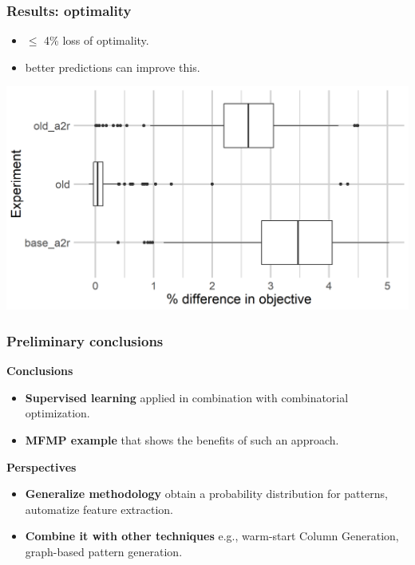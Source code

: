 \begin{frame}
\frametitle{\textbf{Results: optimality}}

  \begin{itemize}[<+->]
    \item $\le$ 4\% loss of optimality.
    \item better predictions can improve this.
  \end{itemize}

  \includegraphics[width=0.8\linewidth]{images/quality_degradation_2tasks}

\end{frame}

\begin{frame}
\frametitle{\textbf{Preliminary conclusions}}
  \pause
  \begin{block}{\textbf{Conclusions}}
    \begin{itemize}[<+->]
    \item \textbf{Supervised learning} 
      applied in combination with combinatorial optimization.
    \item \textbf{MFMP example} 
      that shows the benefits of such an approach.
    \end{itemize}
  \end{block}  
  \pause
  \begin{block}{\textbf{Perspectives}}
    \begin{itemize}[<+->]
      \item \textbf{Generalize methodology} 
        obtain a probability distribution for patterns, automatize feature extraction.
      \item \textbf{Combine it with other techniques} 
        e.g., warm-start Column Generation, graph-based pattern generation.
    \end{itemize}
  \end{block}  
\end{frame}